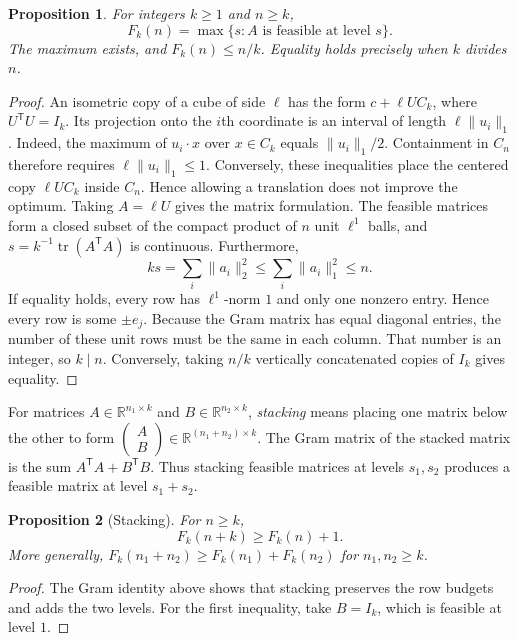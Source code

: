 \documentclass[11pt]{article}
\numberwithin{equation}{section}
\newtheorem{proposition}[proposition]{Proposition}
\theoremstyle{definition}
\theoremstyle{definition}
\newcommand{\R}{\mathbb R}
\newcommand{\norm}[1]{\lVert#1\rVert}
\DeclareMathOperator{\tr}{tr}
\begin{document}
\begin{proposition}\label{prop:matrix-model}
For integers $k\ge1$ and $n\ge k$,
\[
 F_k(n)=\max\{s:A\text{ is feasible at level }s\}.
\]
The maximum exists, and $F_k(n)\le n/k$. Equality holds precisely when
$k$ divides $n$.
\end{proposition}
\begin{proof}
An isometric copy of a cube of side $\ell$ has the form
$c+\ell U C_k$, where $U^{\mathsf T}U=I_k$.  Its projection onto the
$i$th coordinate is an interval of length $\ell\norm{u_i}_1$.
Indeed, the maximum of $u_i\cdot x$ over $x\in C_k$ equals
$\norm{u_i}_1/2$.  Containment in $C_n$ therefore requires
$\ell\norm{u_i}_1\le1$.  Conversely, these inequalities place the
centered copy $\ell U C_k$ inside $C_n$.  Hence allowing a translation
does not improve the optimum.  Taking $A=\ell U$ gives the matrix
formulation.
The feasible matrices form a closed subset of the compact product of
$n$ unit $\ell^1$ balls, and $s=k^{-1}\tr(A^{\mathsf T}A)$ is continuous.
Furthermore,
\[
 ks=\sum_i\norm{a_i}_2^2\le\sum_i\norm{a_i}_1^2\le n.
\]
If equality holds, every row has $\ell^1$-norm $1$ and only one nonzero
entry. Hence every row is some $\pm e_j$. Because the Gram matrix
has equal diagonal entries, the number of these unit rows must be
the same in each column. That number is an integer, so $k\mid n$.
Conversely, taking $n/k$ vertically concatenated copies of $I_k$
gives equality.
\end{proof}

For matrices $A\in\R^{n_1\times k}$ and $B\in\R^{n_2\times k}$,
\emph{stacking} means placing one matrix below the other to form
$\begin{pmatrix}A\\B\end{pmatrix}\in\R^{(n_1+n_2)\times k}$.
The Gram matrix of the stacked matrix is the sum
$A^{\mathsf T}A+B^{\mathsf T}B$. Thus stacking feasible matrices
at levels $s_1,s_2$ produces a feasible matrix at level $s_1+s_2$.

\begin{proposition}[Stacking]\label{prop:stacking}
For $n\ge k$,
\[
 F_k(n+k)\ge F_k(n)+1.
\]
More generally, $F_k(n_1+n_2)\ge F_k(n_1)+F_k(n_2)$ for $n_1,n_2\ge k$.
\end{proposition}
\begin{proof}
The Gram identity above shows that stacking preserves the row budgets
and adds the two levels. For the first inequality, take $B=I_k$,
which is feasible at level $1$.
\end{proof}
\end{document}
